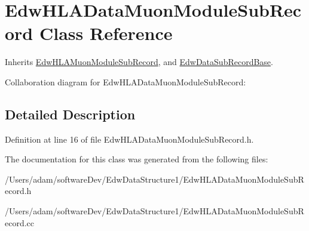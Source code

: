 \hypertarget{class_edw_h_l_a_data_muon_module_sub_record}{
\section{EdwHLADataMuonModuleSubRecord Class Reference}
\label{class_edw_h_l_a_data_muon_module_sub_record}
}


Inherits \hyperlink{class_edw_h_l_a_muon_module_sub_record}{EdwHLAMuonModuleSubRecord}, and \hyperlink{class_edw_data_sub_record_base}{EdwDataSubRecordBase}.



Collaboration diagram for EdwHLADataMuonModuleSubRecord:

\subsection{Detailed Description}


Definition at line 16 of file EdwHLADataMuonModuleSubRecord.h.



The documentation for this class was generated from the following files:\begin{DoxyCompactItemize}
\item 
/Users/adam/softwareDev/EdwDataStructure1/EdwHLADataMuonModuleSubRecord.h\item 
/Users/adam/softwareDev/EdwDataStructure1/EdwHLADataMuonModuleSubRecord.cc\end{DoxyCompactItemize}
